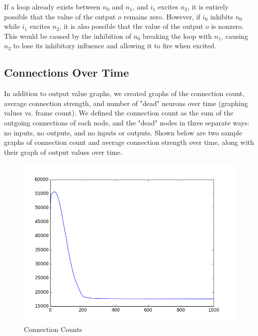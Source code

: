 \documentclass[12pt]{article}
\begin{document}
If a loop already exists between $n_0$ and $n_1$, and $i_1$ excites $n_2$, it is entirely possible that the value of the output $o$ remains zero.  However, if $i_0$ inhibits $n_0$ while $i_1$ excites $n_2$, it is also possible that the value of the output $o$ is nonzero.  This would be caused by the inhibition of $n_0$ breaking the loop with $n_1$, causing $n_2$ to lose its inhibitory influence and allowing it to fire when excited.

\subsection{Connections Over Time}

In addition to output value graphs, we created graphs of the connection count, average connection strength, and number of "dead" neurons over time (graphing values vs. frame count). We defined the connection count as the sum of the outgoing connections of each node, and the "dead" nodes in three separate ways: no inputs, no outputs, and no inputs or outputs.  Shown below are two sample graphs of connection count and average connection strength over time, along with their graph of output values over time.

\begin{figure}[H]
    \includegraphics[width=\linewidth]{../visualizations/counts_lowrate1000frames.png}
    \caption{Connection Counts}
\end{figure}
\end{document}
